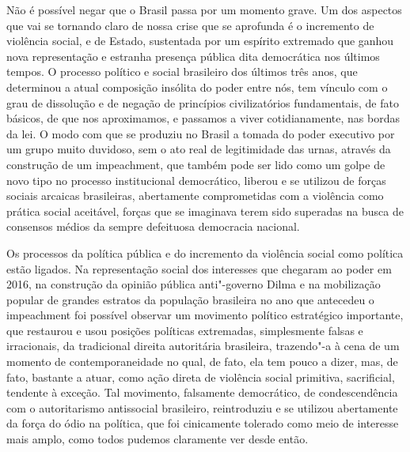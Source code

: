 Não é possível negar que o Brasil passa por um momento grave. Um dos
aspectos que vai se tornando claro de nossa crise que se aprofunda é o
incremento de violência social, e de Estado, sustentada por um espírito
extremado que ganhou nova representação e estranha presença pública dita
democrática nos últimos tempos. O processo político e social brasileiro
dos últimos três anos, que determinou a atual composição insólita do
poder entre nós, tem vínculo com o grau de dissolução e de negação de
princípios civilizatórios fundamentais, de fato básicos, de que nos
aproximamos, e passamos a viver cotidianamente, nas bordas da lei. O
modo com que se produziu no Brasil a tomada do poder executivo por um
grupo muito duvidoso, sem o ato real de legitimidade das urnas, através
da construção de um impeachment, que também pode ser lido como um golpe
de novo tipo no processo institucional democrático, liberou e se
utilizou de forças sociais arcaicas brasileiras, abertamente
comprometidas com a violência como prática social aceitável, forças que
se imaginava terem sido superadas na busca de consensos médios da sempre
defeituosa democracia nacional.

Os processos da política pública e do incremento da violência social
como política estão ligados. Na representação social dos interesses que
chegaram ao poder em 2016, na construção da opinião pública anti"-governo
Dilma e na mobilização popular de grandes estratos da população
brasileira no ano que antecedeu o impeachment foi possível observar um
movimento político estratégico importante, que restaurou e usou posições
políticas extremadas, simplesmente falsas e irracionais, da tradicional
direita autoritária brasileira, trazendo"-a à cena de um momento de
contemporaneidade no qual, de fato, ela tem pouco a dizer, mas, de fato,
bastante a atuar, como ação direta de violência social primitiva,
sacrificial, tendente à exceção. Tal movimento, falsamente democrático,
de condescendência com o autoritarismo antissocial brasileiro,
reintroduziu e se utilizou abertamente da força do ódio na política, que
foi cinicamente tolerado como meio de interesse mais amplo, como todos
pudemos claramente ver desde então.

